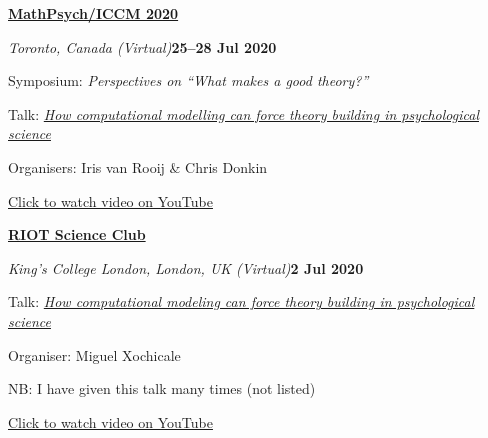 \documentclass[10pt]{article}
\newenvironment{outerlist}[1][\enskip\textbullet]%
        {\begin{itemize}[#1]}{\end{itemize}%
         \vspace{-.6\baselineskip}}
\newenvironment{innerlist}[1][\enskip\textbullet]%
        {\begin{compactitem}[#1]}{\end{compactitem}}
\begin{document}
\textbf{\href{http://mathpsych.org/conferences/2020/}{MathPsych/ICCM 2020}} 
\begin{outerlist}
  \item[] \textit{Toronto, Canada (Virtual)}\hfill\textbf{25--28 Jul 2020}
  \begin{innerlist}
    \item Symposium: \textit{Perspectives on ``What makes a good theory?''}
    \item Talk:  \href{https://youtu.be/8Aa9_6ahO48}{\textit{How computational modelling can force theory building in psychological science}}
    \item Organisers: Iris van Rooij \& Chris Donkin 
    \item  \href{https://youtu.be/8Aa9_6ahO48}{Click to watch video on YouTube}
  \end{innerlist}
\end{outerlist}
\vspace{8pt}

\textbf{\href{https://www.kcl.ac.uk/events/series/riot-science-club}{RIOT Science Club}} 
\begin{outerlist}
  \item[] \textit{King's College London, London, UK (Virtual)}\hfill\textbf{2 Jul 2020}
  \begin{innerlist}
    \item Talk: \href{https://youtu.be/IhlF0B_IQJE}{\textit{How computational modeling can force theory building in psychological science}}
    \item Organiser: Miguel Xochicale
    \item NB: I have given this talk many times (not listed)
    \item \href{https://youtu.be/IhlF0B_IQJE}{Click to watch video on YouTube}
  \end{innerlist}
\end{outerlist}
\vspace{8pt}
\end{document}

